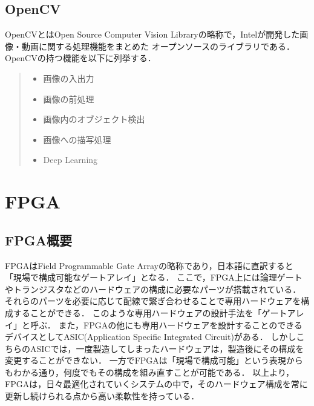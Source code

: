 \documentclass[11pt,a4j]{jreport}
\begin{document}

\subsection{OpenCV}
OpenCVとはOpen Source Computer Vision Libraryの略称で，Intelが開発した画像・動画に関する処理機能をまとめた
オープンソースのライブラリである．OpenCVの持つ機能\cite{OpenCV}を以下に列挙する．
\begin{quote}
  \begin{itemize}
    \item 画像の入出力
    \item 画像の前処理
    \item 画像内のオブジェクト検出
    \item 画像への描写処理
    \item Deep Learning
  \end{itemize}
\end{quote}

\section{FPGA}
\subsection{FPGA概要}
FPGAはField Programmable Gate Arrayの略称であり，日本語に直訳すると「現場で構成可能なゲートアレイ」となる．
ここで，FPGA上には論理ゲートやトランジスタなどのハードウェアの構成に必要なパーツが搭載されている．
それらのパーツを必要に応じて配線で繋ぎ合わせることで専用ハードウェアを構成することができる．
このような専用ハードウェアの設計手法を「ゲートアレイ」と呼ぶ．
また，FPGAの他にも専用ハードウェアを設計することのできるデバイスとしてASIC(Application Specific Integrated Circuit)がある．
しかしこちらのASICでは，一度製造してしまったハードウェアは，製造後にその構成を変更することができない．
一方でFPGAは「現場で構成可能」という表現からもわかる通り，何度でもその構成を組み直すことが可能である．
以上より，FPGAは，日々最適化されていくシステムの中で，そのハードウェア構成を常に更新し続けられる点から高い柔軟性を持っている．
\end{document}
